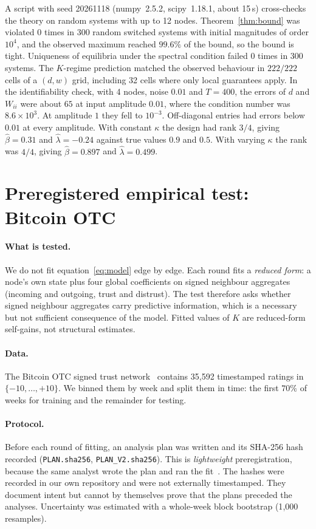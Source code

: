\documentclass[11pt]{article}
\theoremstyle{definition}
\theoremstyle{remark}
\begin{document}
A script with seed 20261118 (numpy~2.5.2, scipy~1.18.1, about 15\,s) cross-checks the theory on random systems
with up to 12 nodes. Theorem~\ref{thm:bound} was violated 0 times in 300 random switched systems with
initial magnitudes of order $10^4$, and the observed maximum reached $99.6\%$ of the bound, so the bound
is tight. Uniqueness of equilibria under the spectral condition failed 0 times in 300 systems. The
$K$-regime prediction matched the observed behaviour in $222/222$ cells of a $(d,w)$ grid, including
32 cells where only local guarantees apply. In the identifiability check, with 4 nodes, noise $0.01$ and
$T=400$, the errors of $d$ and $W_{ii}$ were about $65$ at input amplitude $0.01$, where the condition
number was $8.6\times10^3$. At amplitude $1$ they fell to $10^{-3}$. Off-diagonal entries had errors below $0.01$ at every amplitude. With constant $\kappa$ the design had rank $3/4$, giving
$\hat\beta=0.31$ and $\hat\lambda=-0.24$ against true values $0.9$ and $0.5$. With varying $\kappa$ the
rank was $4/4$, giving $\hat\beta=0.897$ and $\hat\lambda=0.499$.

\section{Preregistered empirical test: Bitcoin OTC}\label{sec:empirical}

\paragraph{What is tested.} We do not fit equation~\eqref{eq:model} edge by edge. Each round fits a
\emph{reduced form}: a node's own state plus four global coefficients on signed neighbour aggregates
(incoming and outgoing, trust and distrust). The test therefore asks whether signed neighbour
aggregates carry predictive information, which is a necessary but not sufficient consequence of the
model. Fitted values of $K$ are reduced-form self-gains, not structural estimates.

\paragraph{Data.} The Bitcoin OTC signed trust network~\cite{kumar2016,snap} contains 35{,}592 timestamped
ratings in $\{-10,\dots,+10\}$. We binned them by week and split them in time: the first $70\%$ of weeks
for training and the remainder for testing.

\paragraph{Protocol.} Before each round of fitting, an analysis plan was written and its SHA-256 hash
recorded (\texttt{PLAN.sha256}, \texttt{PLAN\_V2.sha256}). This is \emph{lightweight} preregistration,
because the same analyst wrote the plan and ran the fit~\cite{nosek2018}. The hashes were recorded in
our own repository and were not externally timestamped. They document intent but cannot by themselves
prove that the plans preceded the analyses. Uncertainty was estimated with
a whole-week block bootstrap (1{,}000 resamples).
\end{document}
